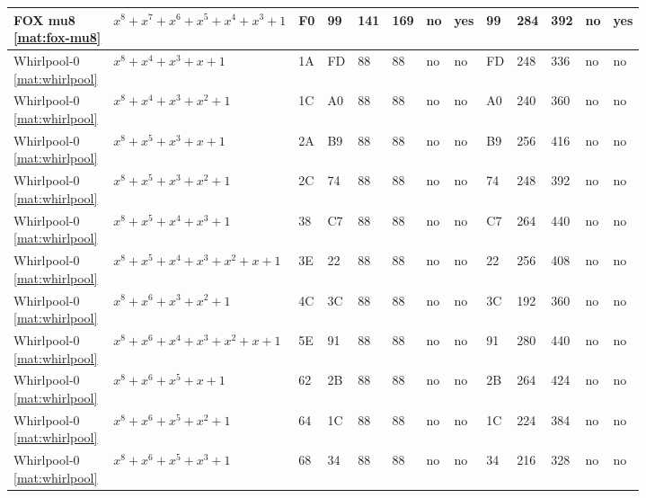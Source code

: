 \begin{tiny}
\begin{longtable}{|l|l|l|l|l|l|l|l|l|l|l|l|l|}
\shortstack{FOX mu8 \\ \eqref{mat:fox-mu8}} & $x^8 + x^7 + x^6 + x^5 + x^4 + x^3 + 1$ & F0 & 99 & 141 & 169 & no & yes & 99 & 284 & 392 & no & yes \\ \hline
\shortstack{Whirlpool-0 \\ \eqref{mat:whirlpool}} & $x^8 + x^4 + x^3 + x + 1$ & 1A & FD & 88 & 88 & no & no & FD & 248 & 336 & no & no \\ \hline
\shortstack{Whirlpool-0 \\ \eqref{mat:whirlpool}} & $x^8 + x^4 + x^3 + x^2 + 1$ & 1C & A0 & 88 & 88 & no & no & A0 & 240 & 360 & no & no \\ \hline
\shortstack{Whirlpool-0 \\ \eqref{mat:whirlpool}} & $x^8 + x^5 + x^3 + x + 1$ & 2A & B9 & 88 & 88 & no & no & B9 & 256 & 416 & no & no \\ \hline
\shortstack{Whirlpool-0 \\ \eqref{mat:whirlpool}} & $x^8 + x^5 + x^3 + x^2 + 1$ & 2C & 74 & 88 & 88 & no & no & 74 & 248 & 392 & no & no \\ \hline
\shortstack{Whirlpool-0 \\ \eqref{mat:whirlpool}} & $x^8 + x^5 + x^4 + x^3 + 1$ & 38 & C7 & 88 & 88 & no & no & C7 & 264 & 440 & no & no \\ \hline
\shortstack{Whirlpool-0 \\ \eqref{mat:whirlpool}} & $x^8 + x^5 + x^4 + x^3 + x^2 + x + 1$ & 3E & 22 & 88 & 88 & no & no & 22 & 256 & 408 & no & no \\ \hline
\shortstack{Whirlpool-0 \\ \eqref{mat:whirlpool}} & $x^8 + x^6 + x^3 + x^2 + 1$ & 4C & 3C & 88 & 88 & no & no & 3C & 192 & 360 & no & no \\ \hline
\shortstack{Whirlpool-0 \\ \eqref{mat:whirlpool}} & $x^8 + x^6 + x^4 + x^3 + x^2 + x + 1$ & 5E & 91 & 88 & 88 & no & no & 91 & 280 & 440 & no & no \\ \hline
\shortstack{Whirlpool-0 \\ \eqref{mat:whirlpool}} & $x^8 + x^6 + x^5 + x + 1$ & 62 & 2B & 88 & 88 & no & no & 2B & 264 & 424 & no & no \\ \hline
\shortstack{Whirlpool-0 \\ \eqref{mat:whirlpool}} & $x^8 + x^6 + x^5 + x^2 + 1$ & 64 & 1C & 88 & 88 & no & no & 1C & 224 & 384 & no & no \\ \hline
\shortstack{Whirlpool-0 \\ \eqref{mat:whirlpool}} & $x^8 + x^6 + x^5 + x^3 + 1$ & 68 & 34 & 88 & 88 & no & no & 34 & 216 & 328 & no & no \\ \hline

\end{longtable}
\end{tiny}
